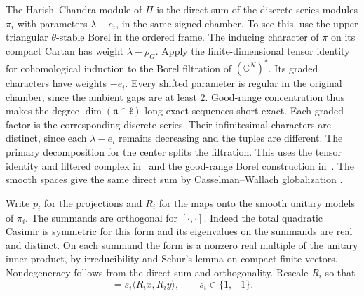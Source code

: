 The Harish--Chandra module of \(\Pi\) is the direct sum of the
discrete-series modules \(\pi_i\) with parameters \(\lambda-e_i\),
in the same signed chamber. To see this, use the upper triangular
\(\theta\)-stable Borel in the ordered frame. The inducing character
of \(\pi\) on its compact Cartan has weight \(\lambda-\rho_G\).
Apply the finite-dimensional tensor identity for cohomological
induction to the Borel filtration of \((\mathbb C^N)^*\). Its graded
characters have weights \(-e_i\). Every shifted parameter is regular
in the original chamber, since the ambient gaps are at least \(2\).
Good-range concentration thus makes the degree-\(\dim(\mathfrak n
\cap\mathfrak k)\) long exact sequences short exact. Each graded factor
is the corresponding discrete series. Their infinitesimal characters
are distinct, since each \(\lambda-e_i\) remains decreasing and the
tuples are different. The primary decomposition for the center splits
the filtration. This uses the tensor identity and filtered complex
in~\cite[Proposition~3.6 and (14)]{real-branch-prudhon} and the
good-range Borel construction in~\cite[Theorems~5.35, 5.99 and~8.2,
and Chapter~XI]{real-branch-knapp-vogan}. The smooth spaces give the
same direct sum by Casselman--Wallach globalization
\cite[Theorems~1.1 and~10.6]{real-branch-bernstein-kroetz}.

Write \(p_i\) for the projections and \(R_i\) for the maps onto the
smooth unitary models of \(\pi_i\). The summands are orthogonal for
\([\cdot,\cdot]\). Indeed the total quadratic Casimir is symmetric
for this form and its eigenvalues on the summands are real and
distinct. On each summand the form is a nonzero real multiple of
the unitary inner product, by irreducibility and Schur's lemma on
compact-finite vectors. Nondegeneracy follows from the direct sum
and orthogonality. Rescale \(R_i\) so that
\begin{equation}
 [x,p_i y]=s_i\langle R_i x,R_i y\rangle,\qquad s_i\in\{1,-1\}.
 \label{eq:real-branch-tensor-form}
\end{equation}

